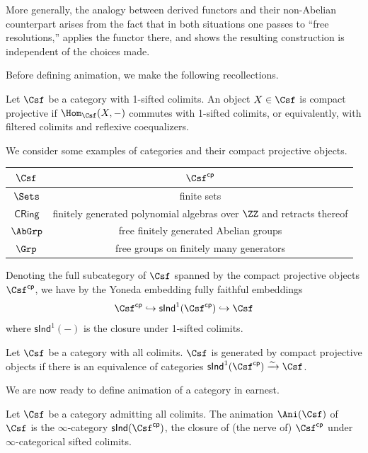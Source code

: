 More generally, the analogy between derived functors and their non-Abelian counterpart arises from the fact that in both situations one passes to ``free resolutions,'' applies the functor there, and shows the resulting construction is independent of the choices made. 

Before defining animation, we make the following recollections. 
\begin{definition}\label{def: compact projective objects}
    Let $\Csf$ be a category with 1-sifted colimits. An object $X\in\Csf$ is compact projective if $\Hom_{\Csf}(X,-)$ commutes with 1-sifted colimits, or equivalently, with filtered colimits and reflexive coequalizers. 
\end{definition}
\begin{example}\label{ex: compact projectives}
    We consider some examples of categories and their compact projective objects. 
    {\begin{center}
        \begin{tabular}{| c | c |}
        \hline 
        $\Csf$ & $\Csf^{\mathsf{cp}}$ \\\hline
        $\Sets$ & finite sets \\\hline
        $\mathsf{CRing}$ & finitely generated polynomial algebras over $\ZZ$ and retracts thereof \\\hline
        $\AbGrp$ & free finitely generated Abelian groups \\\hline
        $\Grp$ & free groups on finitely many generators\\\hline
    \end{tabular}
    \end{center}}
\end{example}
Denoting the full subcategory of $\Csf$ spanned by the compact projective objects $\Csf^{\mathsf{cp}}$, we have by the Yoneda embedding fully faithful embeddings 
$$\Csf^{\mathsf{cp}}\hookrightarrow\mathsf{sInd}^{1}(\Csf^{\mathsf{cp}})\hookrightarrow\Csf$$
where $\mathsf{sInd}^{1}(-)$ is the closure under 1-sifted colimits. 
\begin{definition}\label{def: CPG category}
    Let $\Csf$ be a category with all colimits. $\Csf$ is generated by compact projective objects if there is an equivalence of categories $\mathsf{sInd}^{1}(\Csf^{\mathsf{cp}})\xrightarrow{\sim}\Csf$. 
\end{definition}
We are now ready to define animation of a category in earnest. 
\begin{definition}\label{def: animation of a category}
    Let $\Csf$ be a category admitting all colimits. The animation $\Ani(\Csf)$ of $\Csf$ is the $\infty$-category $\mathsf{sInd}(\Csf^{\mathsf{cp}})$, the closure of (the nerve of) $\Csf^{\mathsf{cp}}$ under $\infty$-categorical sifted colimits. 
\end{definition}
